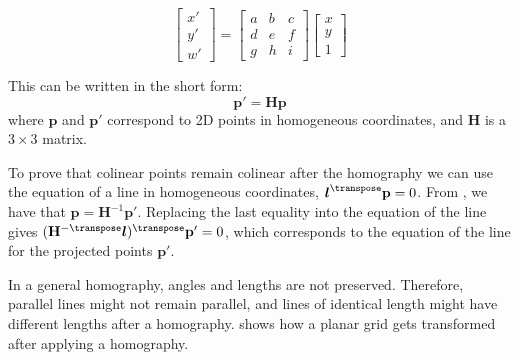 \begin{equation}
    \begin{bmatrix}
    x' \\
    y' \\
    w' 
    \end{bmatrix}
    =
    \begin{bmatrix}
    a & b & c \\
    d & e & f \\
    g & h & i
    \end{bmatrix}
    \begin{bmatrix}
    x \\
    y \\
    1 
    \end{bmatrix}
    \label{eq:homography}
\end{equation}

This can be written in the short form:
\begin{equation}
    \mathbf{p}' = \mathbf{H} \mathbf{p}  
    \label{eq:homography_generic}
\end{equation}
where $\mathbf{p}$ and $\mathbf{p}'$ correspond to 2D points in homogeneous coordinates, and $\mathbf{H}$ is a $3 \times 3$ matrix. 

To prove that colinear points remain colinear after the homography we can use the equation of a line in homogeneous coordinates, $\boldsymbol{l}^\transpose \mathbf{p}=0$. From \eqn{\ref{eq:homography_generic}}, we have that $\mathbf{p} = \mathbf{H}^{-1} \mathbf{p}'$. Replacing the last equality into the equation of the line gives $(\mathbf{H} ^{-\transpose}\boldsymbol{l})^\transpose  \mathbf{p'}=0$, which corresponds to the equation of the line for the projected points $\mathbf{p}'$. 



In a general homography, angles and lengths are not preserved. Therefore, parallel lines might not remain parallel, and lines of identical length might have different lengths after a homography.  \Fig{\ref{fig:illustration_homography2}} shows how a planar grid gets transformed after applying a homography.

